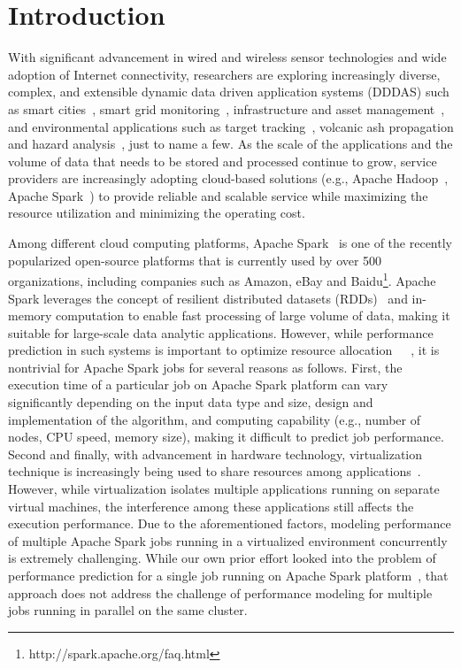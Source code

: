 \section{Introduction}
\label{intro}


With significant advancement in wired and wireless sensor technologies and wide adoption of Internet connectivity, researchers are exploring increasingly diverse, complex, and extensible dynamic data driven application systems (DDDAS) such as smart cities~\cite{iot}, smart grid monitoring~\cite{iot}, infrastructure and asset management~\cite{iot}, and environmental applications such as target tracking~\cite{m4,m6}, volcanic ash propagation and hazard analysis~\cite{m2,m3,m5}, just to name a few. As the scale of the applications and the volume of data that needs to be stored and processed continue to grow, service providers are increasingly adopting cloud-based solutions (e.g., Apache Hadoop~\cite{hadoop}, Apache Spark~\cite{kewencloud}) to provide reliable and scalable service while maximizing the resource utilization and minimizing the operating cost. 


\noindent
Among different cloud computing platforms, Apache Spark~\cite{spark} is one of the recently popularized open-source platforms that is currently used by over 500 organizations, including companies such as Amazon, eBay and Baidu\footnote{http://spark.apache.org/faq.html}. Apache Spark leverages the concept of resilient distributed datasets (RDDs)~\cite{rdd} and in-memory computation to enable fast processing of large volume of data, making it suitable for large-scale data analytic applications. However, while performance prediction in such systems is important to optimize resource allocation~\cite{khan2015hadoop}~\cite{cheng2015resource}~\cite{delimitrou2014quasar}, it is nontrivial for Apache Spark jobs for several reasons as follows. First, the execution time of a particular job on Apache Spark platform can vary significantly depending on the input data type and size, design and implementation of the algorithm, and computing capability (e.g., number of nodes, CPU speed, memory size), making it difficult to predict job performance. Second and finally, with advancement in hardware technology, virtualization technique is increasingly being used to share resources among applications~\cite{hybridmr}. However, while virtualization isolates multiple applications running on separate virtual machines, the interference among these applications still affects the execution performance. Due to the aforementioned factors, modeling performance of multiple Apache Spark jobs running in a virtualized environment concurrently is extremely challenging. While our own prior effort looked into the problem of performance prediction for a single job running on Apache Spark platform~\cite{wangperformance}, that approach does not address the challenge of performance modeling for multiple jobs running in parallel on the same cluster.



